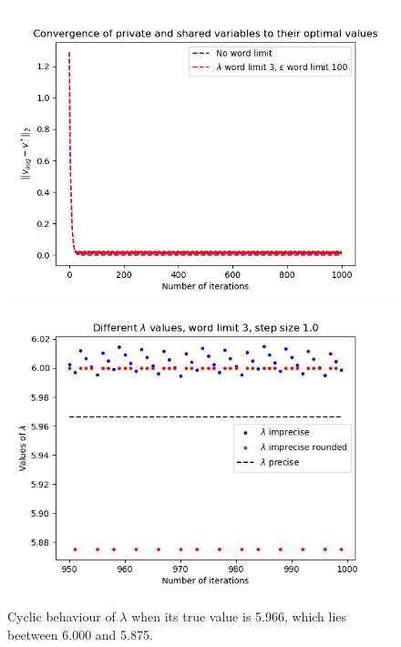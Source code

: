 \documentclass[12pt]{article}
\begin{document}
\begin{figure}[H]
	\includegraphics[scale=0.5]{Problem4-lambda3.png}
	\includegraphics[scale=0.5]{Problem4-lambda4.png}
	\caption{Cyclic behaviour of $\lambda$ when its true value is 5.966, which lies beetween 6.000 and 5.875.}
\end{figure}

\end{document}
